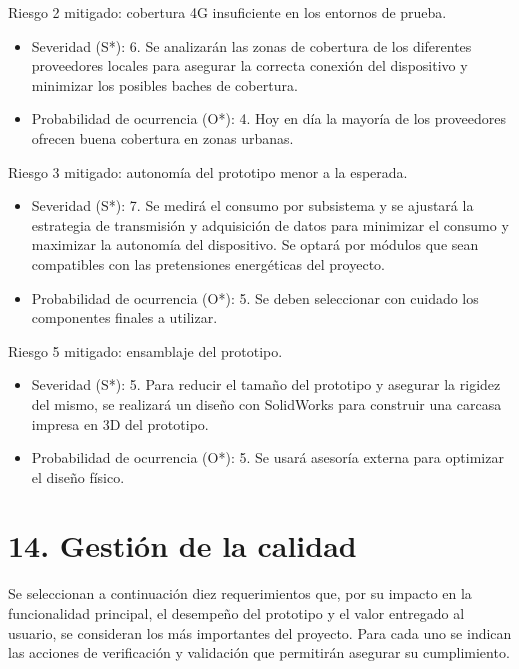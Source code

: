 \documentclass[
11pt, %
]{charter}
\begin{document}
Riesgo 2 mitigado: cobertura 4G insuficiente en los entornos de prueba.
\begin{itemize}
	\item Severidad (S*): 6.  Se analizarán las zonas de cobertura de los diferentes proveedores locales para asegurar la correcta conexión del dispositivo y minimizar los posibles baches de cobertura.	
	\item Probabilidad de ocurrencia (O*): 4. Hoy en día la mayoría de los proveedores ofrecen buena cobertura en zonas urbanas.
\end{itemize}

Riesgo 3 mitigado: autonomía del prototipo menor a la esperada.
\begin{itemize}	
	\item Severidad (S*): 7. Se medirá el consumo por subsistema y se ajustará la estrategia de transmisión y adquisición de datos para minimizar el consumo y maximizar la autonomía del dispositivo. Se optará por módulos que sean compatibles con las pretensiones energéticas del proyecto.
	\item Probabilidad de ocurrencia (O*): 5. Se deben seleccionar con cuidado los componentes finales a utilizar.
\end{itemize}

Riesgo 5 mitigado: ensamblaje del prototipo.
\begin{itemize}
	\item Severidad (S*): 5. Para reducir el tamaño del prototipo y asegurar la rigidez del mismo, se realizará un diseño con SolidWorks para construir una carcasa impresa en 3D del prototipo. 
	\item Probabilidad de ocurrencia (O*): 5. Se usará asesoría externa para optimizar el diseño físico.
\end{itemize}

\section{14. Gestión de la calidad}
\label{sec:calidad}

Se seleccionan a continuación diez requerimientos que, por su impacto en la funcionalidad principal, el desempeño del prototipo y el valor entregado al usuario, se consideran los más importantes del proyecto. Para cada uno se indican las acciones de verificación y validación que permitirán asegurar su cumplimiento.
\end{document}
